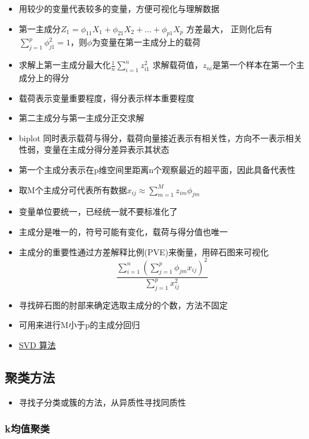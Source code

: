 \documentclass[]{book}
\providecommand{\tightlist}{%
  \setlength{\itemsep}{0pt}\setlength{\parskip}{0pt}}
\begin{document}
\begin{itemize}
\tightlist
\item
  用较少的变量代表较多的变量，方便可视化与理解数据
\item
  第一主成分\(Z_1 = \phi_{11} X_1 + \phi_{21}X_2 + ... + \phi_{p1} X_p\) 方差最大， 正则化后有\(\sum_{j = 1}^p \phi_{j1}^2 = 1\)，则\(\phi\)为变量在第一主成分上的载荷
\item
  求解上第一主成分最大化\(\frac{1}{n} \sum_{i = 1}^{n} z_{i1}^2\) 求解载荷值，\(z_{ni}\)是第一个样本在第一个主成分上的得分
\item
  载荷表示变量重要程度，得分表示样本重要程度
\item
  第二主成分与第一主成分正交求解
\item
  biplot 同时表示载荷与得分，载荷向量接近表示有相关性，方向不一表示相关性弱，变量在主成分得分差异表示其状态
\item
  第一个主成分表示在p维空间里距离n个观察最近的超平面，因此具备代表性
\item
  取M个主成分可代表所有数据\(x_{ij} \approx \sum_{m = 1}^M z_{im} \phi_{jm}\)
\item
  变量单位要统一，已经统一就不要标准化了
\item
  主成分是唯一的，符号可能有变化，载荷与得分值也唯一
\item
  主成分的重要性通过方差解释比例(PVE)来衡量，用碎石图来可视化\[\frac{\sum_{i = 1}^n (\sum_{j =1}^p \phi_{jm} x_{ij})^2}{\sum_{j =1}^p x_{ij}^2}\]
\item
  寻找碎石图的肘部来确定选取主成分的个数，方法不固定
\item
  可用来进行M小于p的主成分回归
\item
  \href{https://github.com/j2kun/svd}{SVD 算法}
\end{itemize}

\hypertarget{ux805aux7c7bux65b9ux6cd5}{%
\subsection{聚类方法}\label{ux805aux7c7bux65b9ux6cd5}}

\begin{itemize}
\tightlist
\item
  寻找子分类或簇的方法，从异质性寻找同质性
\end{itemize}

\hypertarget{kux5747ux503cux805aux7c7b}{%
\subsubsection{k均值聚类}\label{kux5747ux503cux805aux7c7b}}
\end{document}
